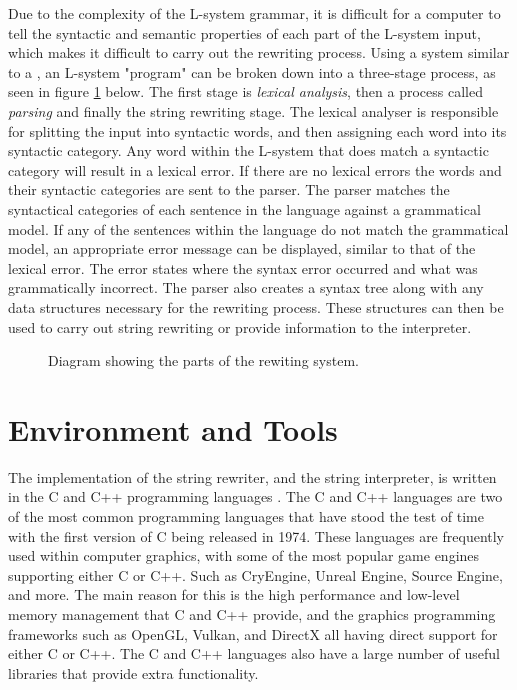 Due to the complexity of the L-system grammar, it is difficult for a computer to tell the syntactic and semantic properties of each part of the L-system input, which makes it difficult to carry out the rewriting process. Using a system similar to a , an L-system "program" can be broken down into a three-stage process, as seen in figure \ref{3D rotations} below. The first stage is \textit{lexical analysis}, then a process called \textit{parsing} and finally the string rewriting stage. The lexical analyser is responsible for splitting the input into syntactic words, and then assigning each word into its syntactic category. Any word within the L-system that does match a syntactic category will result in a lexical error. If there are no lexical errors the words and their syntactic categories are sent to the parser. The parser matches the syntactical categories of each sentence in the language against a grammatical model. If any of the sentences within the language do not match the grammatical model, an appropriate error message can be displayed, similar to that of the lexical error. The error states where the syntax error occurred and what was grammatically incorrect. The parser also creates a syntax tree along with any data structures necessary for the rewriting process. These structures can then be used to carry out string rewriting or provide information to the interpreter.

\begin{figure}[htbp]
	{\centering
		\setlength{\fboxrule}{1pt}
		\vspace{7px}
		\caption{Diagram showing the parts of the rewiting system.} \label{3D rotations}
	}
\end{figure}
\FloatBarrier

\section{Environment and Tools}

The implementation of the string rewriter, and the string interpreter, is written in the C and C++ programming languages \cite{stroustrup2000c++}. The C and C++ languages are two of the most common programming languages that have stood the test of time with the first version of C being released in 1974. These languages are frequently used within computer graphics, with some of the most popular game engines supporting either C or C++. Such as CryEngine, Unreal Engine, Source Engine, and more. The main reason for this is the high performance and low-level memory management that C and C++ provide, and the graphics programming frameworks such as OpenGL, Vulkan, and DirectX all having direct support for either C or C++. The C and C++ languages also have a large number of useful libraries that provide extra functionality.  

